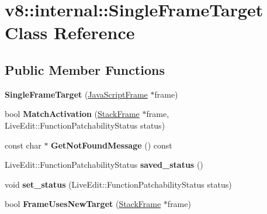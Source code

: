 \hypertarget{classv8_1_1internal_1_1_single_frame_target}{}\section{v8\+:\+:internal\+:\+:Single\+Frame\+Target Class Reference}
\label{classv8_1_1internal_1_1_single_frame_target}
\subsection*{Public Member Functions}
\begin{DoxyCompactItemize}
\item 
{\bfseries Single\+Frame\+Target} (\hyperlink{classv8_1_1internal_1_1_java_script_frame}{Java\+Script\+Frame} $\ast$frame)\hypertarget{classv8_1_1internal_1_1_single_frame_target_a00d5b78ddee5f1672be046372657766c}{}\label{classv8_1_1internal_1_1_single_frame_target_a00d5b78ddee5f1672be046372657766c}

\item 
bool {\bfseries Match\+Activation} (\hyperlink{classv8_1_1_stack_frame}{Stack\+Frame} $\ast$frame, Live\+Edit\+::\+Function\+Patchability\+Status status)\hypertarget{classv8_1_1internal_1_1_single_frame_target_a89565a725f8bba4c0e25500340420d90}{}\label{classv8_1_1internal_1_1_single_frame_target_a89565a725f8bba4c0e25500340420d90}

\item 
const char $\ast$ {\bfseries Get\+Not\+Found\+Message} () const \hypertarget{classv8_1_1internal_1_1_single_frame_target_affaaca2e2169b2be3d82591cebae94d8}{}\label{classv8_1_1internal_1_1_single_frame_target_affaaca2e2169b2be3d82591cebae94d8}

\item 
Live\+Edit\+::\+Function\+Patchability\+Status {\bfseries saved\+\_\+status} ()\hypertarget{classv8_1_1internal_1_1_single_frame_target_a039a30540836036c904a371d0658b7b6}{}\label{classv8_1_1internal_1_1_single_frame_target_a039a30540836036c904a371d0658b7b6}

\item 
void {\bfseries set\+\_\+status} (Live\+Edit\+::\+Function\+Patchability\+Status status)\hypertarget{classv8_1_1internal_1_1_single_frame_target_a2e31568efaa86f9168396390019274ab}{}\label{classv8_1_1internal_1_1_single_frame_target_a2e31568efaa86f9168396390019274ab}

\item 
bool {\bfseries Frame\+Uses\+New\+Target} (\hyperlink{classv8_1_1_stack_frame}{Stack\+Frame} $\ast$frame)\hypertarget{classv8_1_1internal_1_1_single_frame_target_a077a0d70db77c98c439759a09b926233}{}\label{classv8_1_1internal_1_1_single_frame_target_a077a0d70db77c98c439759a09b926233}

\end{DoxyCompactItemize}
